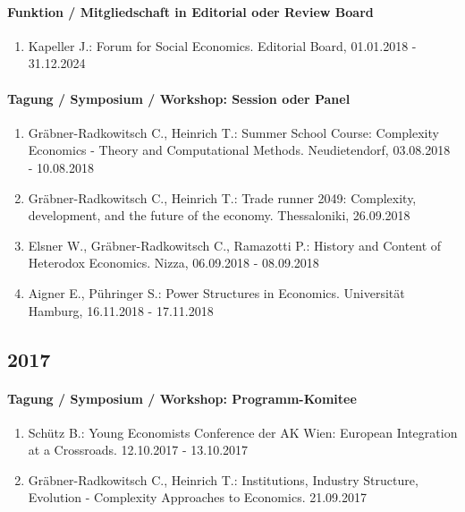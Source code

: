 \paragraph{Funktion / Mitgliedschaft in Editorial oder Review Board} 
\begin{enumerate}[leftmargin=*, labelsep=0.5cm] 
 	 \item Kapeller J.: Forum for Social Economics. Editorial Board, 01.01.2018 - 31.12.2024 
\end{enumerate} 
\paragraph{Tagung / Symposium / Workshop: Session oder Panel} 
\begin{enumerate}[leftmargin=*, labelsep=0.5cm] 
 	 \item Gräbner-Radkowitsch C., Heinrich T.: Summer School Course: Complexity Economics - Theory and Computational Methods. Neudietendorf, 03.08.2018 - 10.08.2018 
	 \item Gräbner-Radkowitsch C., Heinrich T.: Trade runner 2049: Complexity, development, and the future of the economy. Thessaloniki, 26.09.2018 
	 \item Elsner W., Gräbner-Radkowitsch C., Ramazotti P.: History and Content of Heterodox Economics. Nizza, 06.09.2018 - 08.09.2018 
	 \item Aigner E., Pühringer S.: Power Structures in Economics. Universität Hamburg, 16.11.2018 - 17.11.2018 
\end{enumerate} 
\subsection*{2017} 
\paragraph{Tagung / Symposium / Workshop: Programm-Komitee} 
\begin{enumerate}[leftmargin=*, labelsep=0.5cm] 
 	 \item Schütz B.: Young Economists Conference der AK Wien: European Integration at a Crossroads. 12.10.2017 - 13.10.2017 
	 \item Gräbner-Radkowitsch C., Heinrich T.: Institutions, Industry Structure, Evolution - Complexity Approaches to Economics. 21.09.2017 
\end{enumerate} 
